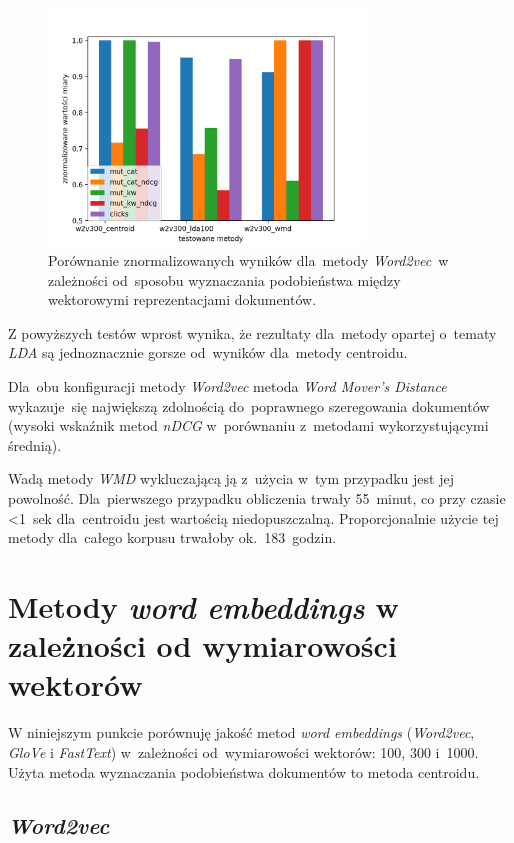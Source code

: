 \documentclass[pl]{minipw} %
\begin{document}
\begin{figure}[H]
	\centering
	\includegraphics[width=0.75\textwidth]{img/results/w2v300_centroid_w2v300_lda100_w2v300_wmd_.png}
	\caption{Porównanie znormalizowanych wyników dla~metody \textit{Word2vec}~w zależności od~sposobu wyznaczania podobieństwa między wektorowymi reprezentacjami dokumentów.}
\end{figure}

Z powyższych testów wprost wynika, że rezultaty dla~metody opartej o~tematy \textit{LDA} są jednoznacznie gorsze od~wyników dla~metody centroidu.

Dla~obu konfiguracji metody \textit{Word2vec} metoda \textit{Word Mover's Distance} wykazuje~się największą zdolnością do~poprawnego szeregowania dokumentów (wysoki wskaźnik metod \textit{nDCG} w~porównaniu z~metodami wykorzystującymi średnią).

Wadą metody \textit{WMD} wykluczającą ją z~użycia w~tym przypadku jest jej powolność. Dla~pierwszego przypadku  obliczenia trwały 55~minut, co przy czasie <1~sek dla~centroidu jest wartością niedopuszczalną. Proporcjonalnie użycie tej metody dla~całego korpusu trwałoby ok.~183~godzin.


\section{Metody \textit{word embeddings} w zależności od wymiarowości wektorów}

W niniejszym punkcie porównuję jakość metod \textit{word embeddings} (\textit{Word2vec}, \textit{GloVe} i \textit{FastText}) w~zależności od~wymiarowości wektorów: 100, 300 i~1000. Użyta metoda wyznaczania podobieństwa dokumentów to metoda centroidu.

\subsection{\textit{Word2vec}}
\end{document}
